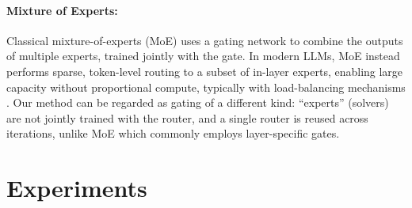 \documentclass{article}
\begin{document}
\paragraph{Mixture of Experts:} Classical mixture-of-experts (MoE) \citep{jacobs1991adaptive,jordan1994hierarchical} uses a gating network to combine the outputs of multiple experts, trained jointly with the gate. In modern LLMs, MoE instead performs sparse, token-level routing to a subset of in-layer experts, enabling large capacity without proportional compute, typically with load-balancing mechanisms \citep{shazeer2017outrageously,lepikhin2020gshard,fedus2022switch,jiang2024mixtral}. 
Our method can be regarded as gating of a different kind: ``experts'' (solvers) are not jointly trained with the router, and a single router is reused across iterations, unlike MoE which commonly employs layer-specific gates.

\section{Experiments}\label{sec:experiments}
\end{document}
